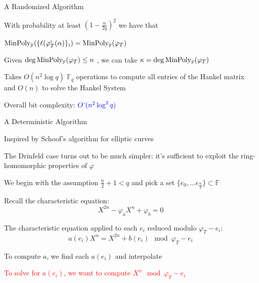 \documentclass{beamer}
\newcommand{\minpol}{\textnormal{MinPoly}_{\mathbb{F}}}
\newcommand{\f}{\mathbb{F}}
\newcommand{\blue}{\textcolor{blue}}
\newcommand{\red}{\textcolor{red}}
\begin{document}
\begin{frame}{A Randomized Algorithm}


    \item  With probability at least $(1 - \frac{n}{2q})^2$ we have that \item \centerline{$\minpol(\{\ell(\varphi_T^i(\alpha)\}_i) = \minpol(\varphi_T)$}
    
    \item Given $\deg \minpol(\varphi_T) \leq n$ , we can take $\kappa = \deg \minpol(\varphi_T)$

        \item Takes $O(n^2 \log q)$ $\f_q$ operations to compute all entries of the Hankel matrix and $O(n)$ to solve the Hankel System
    \item Overall bit complexity: $\blue{O\tilde{~}(n^2 \log^2 q)}$

\end{frame}


\begin{frame}{A Deterministic Algorithm}


    \item Inspired by Schoof's algorithm for elliptic curves
    \item The Drinfeld case turns out to be much simpler: it's sufficient to exploit the ring-homomorphic properties of $\varphi$
    \item We begin with the assumption $ \frac{n}{2} + 1 < q$ and pick a set $\{e_0, \ldots e_{\frac{n}{2}}\} \subset \mathbb{F}$
    \item Recall the characteristic equation:
    \[X^{2n} - \varphi_a X^n + \varphi_b = 0\]
    \item The characteristic equation applied to each $e_i$ reduced modulo $\varphi_{T} - e_i$:
    \[a(e_i) X^n  = X^{2n} + b(e_i) \mod \varphi_{T} - e_i \]
    \item To compute $a$, we find each $a(e_i)$ and interpolate
    \item \red{To solve for $a(e_i)$, we want to compute $X^n \mod \varphi_{T} - e_i$}

    
\end{frame}
\end{document}
